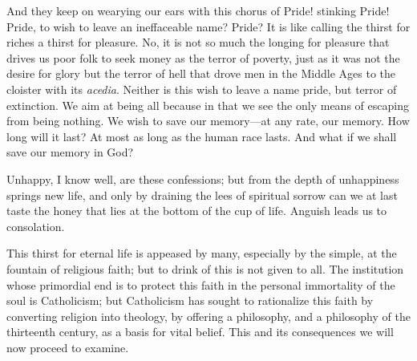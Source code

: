 And they keep on wearying our ears with this chorus of Pride! stinking
Pride! Pride, to wish to leave an ineffaceable name? Pride? It is like
calling the thirst for riches a thirst for pleasure. No, it is not so
much the longing for pleasure that drives us poor folk to seek money
as the terror of poverty, just as it was not the  desire for
glory but the terror of hell that drove men in the Middle Ages to the
cloister with its \textit{acedia}. Neither is this wish to leave a
name pride, but terror of extinction. We aim at being all because in
that we see the only means of escaping from being nothing. We wish to
save our mem\-o\-ry---at any rate, our memory. How long will it last?
At most as long as the human race lasts. And what if we shall save our
memory in God?

Unhappy, I know well, are these confessions; but from the depth of
unhappiness springs new life, and only by draining the lees of
spiritual sorrow can we at last taste the honey that lies at the
bottom of the cup of life. Anguish leads us to consolation.

This thirst for eternal life is appeased by many, especially by the
simple, at the fountain of religious faith; but to drink of this is
not given to all. The institution whose primordial end is to protect
this faith in the personal immortality of the soul is Catholicism; but
Catholicism has sought to rationalize this faith by converting
religion into theology, by offering a philosophy, and a philosophy of
the thirteenth century, as a basis for vital belief. This and its
consequences we will now proceed to examine.

